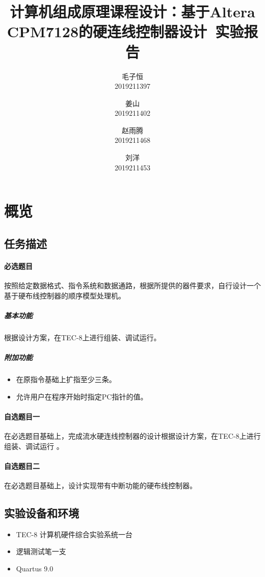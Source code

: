 \documentclass[lang=cn,11pt,a4paper,cite=authornum]{paper}
\title{计算机组成原理课程设计：基于Altera CPM7128的硬连线控制器设计\ 实验报告}
\author{毛子恒 \\ 2019211397 \and 姜山 \\ 2019211402 \and 赵雨腾 \\ 2019211468 \and 刘洋 \\ 2019211453}
\institute{北京邮电大学\ 计算机学院}
\date{\zhtoday}
\begin{document}
\maketitle

\tableofcontents

\section{概览}

\subsection{任务描述}

\paragraph{必选题目}

按照给定数据格式、指令系统和数据通路，根据所提供的器件要求，自行设计一个基于硬布线控制器的顺序模型处理机。

\subparagraph{基本功能} 根据设计方案，在TEC-8上进行组装、调试运行。
\subparagraph{附加功能}

\begin{itemize}
    \item 在原指令基础上扩指至少三条。
    \item 允许用户在程序开始时指定PC指针的值。
\end{itemize}

\paragraph{自选题目一}

在必选题目基础上，完成流水硬连线控制器的设计根据设计方案，在TEC-8上进行组装、调试运行  。

\paragraph{自选题目二}

在必选题目基础上，设计实现带有中断功能的硬布线控制器。

\subsection{实验设备和环境}

\begin{itemize}
    \item TEC-8 计算机硬件综合实验系统一台
    \item 逻辑测试笔一支
    \item Quartus \uppercase\expandafter{} 9.0
\end{itemize}
\end{document}

